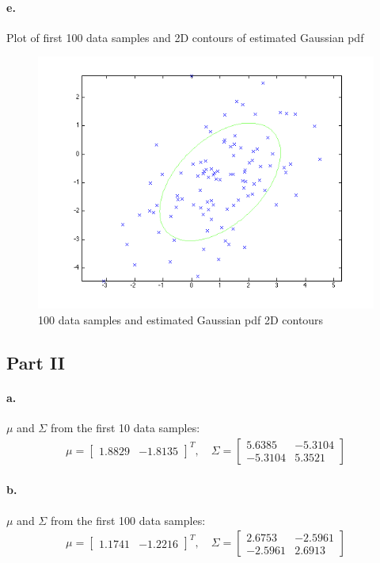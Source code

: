 \documentclass[a4paper]{article}
\begin{document}
\paragraph{e.} Plot of first 100 data samples and 2D contours of estimated Gaussian pdf \\
\begin{figure}[H]
  \centering
    \includegraphics[scale=.47]{images/3_f_I.png}
  \caption{100 data samples and estimated Gaussian pdf 2D contours}
\end{figure}

\subsection*{Part II}

\paragraph{a.} $\mu$ and $\Sigma$ from the first 10 data samples: \\
\begin{align*}
	\mu = \begin{bmatrix}
		1.8829 & -1.8135
	\end{bmatrix}^{T}, \quad
	\Sigma = \begin{bmatrix}
		 5.6385  & -5.3104 \\
		-5.3104  &  5.3521
	\end{bmatrix}
\end{align*}

\paragraph{b.} $\mu$ and $\Sigma$ from the first 100 data samples: \\
\begin{align*}
	\mu = \begin{bmatrix}
		1.1741 & -1.2216
	\end{bmatrix}^{T}, \quad
	\Sigma = \begin{bmatrix}
		 2.6753  & -2.5961 \\
		-2.5961  &  2.6913
	\end{bmatrix}
\end{align*}
\end{document}
